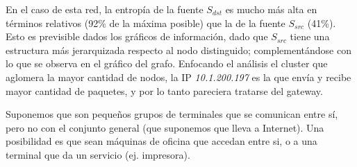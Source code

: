 En el caso de esta red, la entropía de la fuente $S_{dst}$ es mucho más alta en términos relativos (92\% de la máxima posible) que la de la fuente $S_{src}$ (41\%). Esto es previsible dados los gráficos de información, dado que $S_{src}$ tiene una estructura más jerarquizada respecto al nodo distinguido; complementándose con lo que se observa en el gráfico del grafo.
Enfocando el análisis el cluster que aglomera la mayor cantidad de nodos, la IP \emph{10.1.200.197} es la que envía y recibe mayor cantidad de paquetes, y por lo tanto pareciera tratarse del gateway.

Suponemos que son pequeños grupos de terminales que se comunican entre sí, pero no con el conjunto general (que suponemos que lleva a Internet). Una posibilidad es que sean máquinas de oficina que accedan entre si, o a una terminal que da un servicio (ej. impresora).